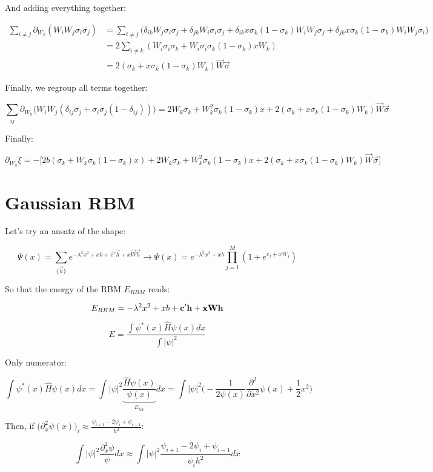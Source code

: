 \documentclass{book}
\begin{document}
And adding everything together:

\begin{align*}
    \sum_{i\neq j}\partial_{W_k}(W_iW_j\sigma_i\sigma_j)&=\sum_{i\neq j}\bigg(\delta_{ik}W_j\sigma_i\sigma_j+\delta_{jk}W_i\sigma_i\sigma_j+\delta_{ik}x\sigma_k(1-\sigma_k)W_iW_j\sigma_j+\delta_{jk}x\sigma_k(1-\sigma_k)W_iW_j\sigma_i\bigg)\\&=2\sum_{i\neq k}(W_i\sigma_i\sigma_k+W_i\sigma_i\sigma_k(1-\sigma_k)xW_k)\\&=2(\sigma_k+x\sigma_k(1-\sigma_k)W_k)\vec{W}\vec{\sigma}
\end{align*}

Finally, we regroup all terms together:

\[\sum_{ij}\partial_{W_k}\bigg(W_iW_j(\delta_{ij}\sigma_j+\sigma_i\sigma_j(1-\delta_{ij}))\bigg)=2W_k\sigma_k+W_k^2\sigma_k(1-\sigma_k)x+2(\sigma_k+x\sigma_k(1-\sigma_k)W_k)\vec{W}\vec{\sigma}\]

Finally:

\[\partial_{W_k}\xi=-\bigg[2b(\sigma_k+W_k\sigma_k(1-\sigma_k)x)+2W_k\sigma_k+W_k^2\sigma_k(1-\sigma_k)x+2(\sigma_k+x\sigma_k(1-\sigma_k)W_k)\vec{W}\vec{\sigma}\bigg]\]

\section{Gaussian RBM}

Let's try an ansatz of the shape:

\[\Psi(x)=\sum_{\{\vec{h}\}}e^{-\lambda^2x^2+xb+\vec{c}'\vec{h}+x\vec{W}\vec{h}}\to\Psi(x)=e^{-\lambda^2x^2+xb}\prod_{j=1}^M(1+e^{c_j+xW_j})\]

So that the energy of the RBM $E_{RBM}$ reads:

\[E_{RBM}=-\lambda^2x^2+xb+\bf{c}'\bf{h}+x\bf{W}\bf{h}\]

\[E=\frac{\int\psi^*(x)\hat{H}\psi(x) dx}{\int|\psi|^2}\]

Only numerator:

\[\int\psi^*(x)\hat{H}\psi(x) dx=\int |\psi|^2\underbrace{\frac{\hat{H}\psi(x)}{\psi(x)}}_{E_{loc}}dx=\int|\psi|^2\bigg(-\frac{1}{2\psi(x)}\frac{\partial^2}{\partial x^2}\psi(x)+\frac12 x^2\bigg)\]

Then, if $\bigg(\partial_x^2\psi(x)\bigg)_i\approx \frac{\psi_{i+1}-2\psi_i+\psi_{i-1}}{h^2}$:

\[\int|\psi|^2\frac{\partial_x^2\psi}{\psi}dx\approx \int |\psi|^2\frac{\psi_{i+1}-2\psi_i+\psi_{i-1}}{\psi_ih^2}dx\]
\end{document}
